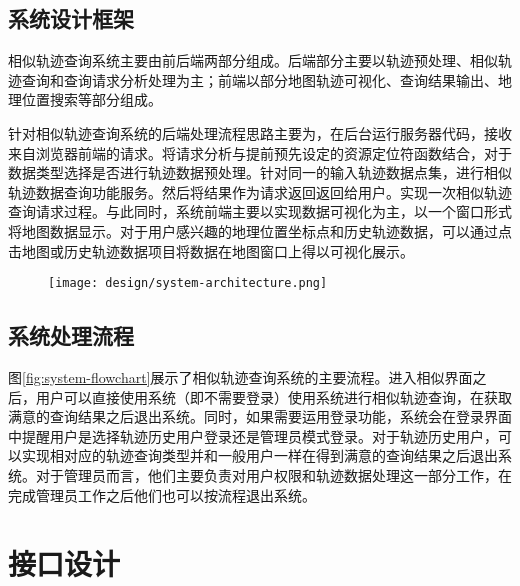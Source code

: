 \subsection{系统设计框架}
\label{subsec:product perspective}
相似轨迹查询系统主要由前后端两部分组成。后端部分主要以轨迹预处理、相似轨迹查询和查询请求分析处理为主；前端以部分地图轨迹可视化、查询结果输出、地理位置搜索等部分组成。

针对相似轨迹查询系统的后端处理流程思路主要为，在后台运行服务器代码，接收来自浏览器前端的请求。将请求分析与提前预先设定的资源定位符函数结合，对于数据类型选择是否进行轨迹数据预处理。针对同一的输入轨迹数据点集，进行相似轨迹数据查询功能服务。然后将结果作为请求返回返回给用户。实现一次相似轨迹查询请求过程。与此同时，系统前端主要以实现数据可视化为主，以一个窗口形式将地图数据显示。对于用户感兴趣的地理位置坐标点和历史轨迹数据，可以通过点击地图或历史轨迹数据项目将数据在地图窗口上得以可视化展示。

\begin{figure}[!htp]
  \centering
  \texttt{[image: design/system-architecture.png]}
\end{figure}


\subsection{系统处理流程}
图\ref{fig:system-flowchart}展示了相似轨迹查询系统的主要流程。进入相似界面之后，用户可以直接使用系统（即不需要登录）使用系统进行相似轨迹查询，在获取满意的查询结果之后退出系统。同时，如果需要运用登录功能，系统会在登录界面中提醒用户是选择轨迹历史用户登录还是管理员模式登录。对于轨迹历史用户，可以实现相对应的轨迹查询类型并和一般用户一样在得到满意的查询结果之后退出系统。对于管理员而言，他们主要负责对用户权限和轨迹数据处理这一部分工作，在完成管理员工作之后他们也可以按流程退出系统。

\label{subsec:system flow}
\begin{figure}[!htp]
    \centering
    \resizebox{14cm}{!}{}
\end{figure}


\section{接口设计}
\label{sec:interface design}

